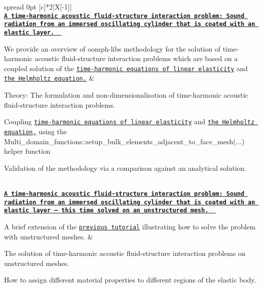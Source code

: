 \begin{longtabu} spread 0pt [c]{*{2}{|X[-1]}|}
\hline
{}\\
\href{../../acoustic_fsi/acoustic_fsi_annulus/html/index.html}{\tt {\bfseries  A time-\/harmonic acoustic fluid-\/structure interaction problem\+: Sound radiation from an immersed oscillating cylinder that is coated with an elastic layer. } }

We provide an overview of {\ttfamily oomph-\/lib\textquotesingle{}s} methodology for the solution of time-\/harmonic acoustic fluid-\/structure interaction problems which are based on a coupled solution of the \href{../../time_harmonic_linear_elasticity/elastic_annulus/html/index.html}{\tt time-\/harmonic equations of linear elasticity} and \href{../../helmholtz/scattering/html/index.html}{\tt the Helmholtz equation.}  &
\begin{DoxyItemize}
\item Theory\+: The formulation and non-\/dimensionalisation of time-\/harmonic acoustic fluid-\/structure interaction problems.
\item Coupling \href{../../time_harmonic_linear_elasticity/elastic_annulus/html/index.html}{\tt time-\/harmonic equations of linear elasticity} and \href{../../helmholtz/scattering/html/index.html}{\tt the Helmholtz equation,} using the {\ttfamily Multi\+\_\+domain\+\_\+functions\+::setup\+\_\+bulk\+\_\+elements\+\_\+adjacent\+\_\+to\+\_\+face\+\_\+mesh}(...) helper function
\item Validation of the methodology via a comparison against an analytical solution. 
\end{DoxyItemize}

\\
\href{../../acoustic_fsi/unstructured_acoustic_fsi_annulus/html/index.html}{\tt {\bfseries  A time-\/harmonic acoustic fluid-\/structure interaction problem\+: Sound radiation from an immersed oscillating cylinder that is coated with an elastic layer -- this time solved on an unstructured mesh. } }

A brief extension of the \href{../../acoustic_fsi/acoustic_fsi_annulus/html/index.html}{\tt previous tutorial} illustrating how to solve the problem with unstructured meshes.  &
\begin{DoxyItemize}
\item The solution of time-\/harmonic acoustic fluid-\/structure interaction problems on unstructured meshes.
\item How to assign different material properties to different regions of the elastic body. 
\end{DoxyItemize}




\end{longtabu}
